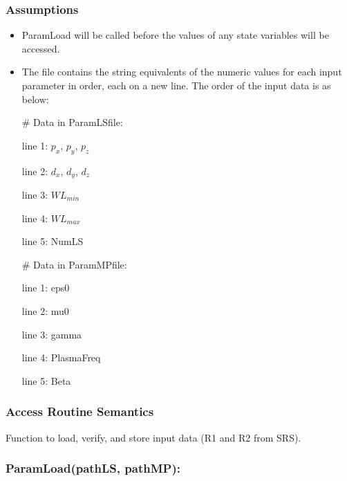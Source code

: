 \documentclass[12pt, titlepage]{article}
\begin{document}
	\subsubsection{Assumptions} \begin{itemize}
		
		\item ParamLoad will be called before the values of any state variables will be
		accessed.
		
		\item The file contains the string equivalents of the numeric values for each
		input parameter in order, each on a new line. The order of the input data is as
		below:
		
		\# Data in ParamLSfile:
		
		line 1: $p_x$, $p_y$, $p_z$
		
		line 2: $d_x$, $d_y$, $d_z$
		
		line 3: $WL_{min}$
		
		line 4: $WL_{max}$
		
		line 5: NumLS
		
		\# Data in ParamMPfile:
		
		line 1: eps0
		
		line 2: mu0
		
		line 3: gamma
		
		line 4: PlasmaFreq
		
		line 5: Beta
		
		
	\end{itemize}
	
	\subsubsection{Access Routine Semantics}
	
	Function to load, verify, and store input data (R1 and R2 from SRS).
	
	\subsubsection*{ParamLoad(pathLS, pathMP):}
	
\end{document}
